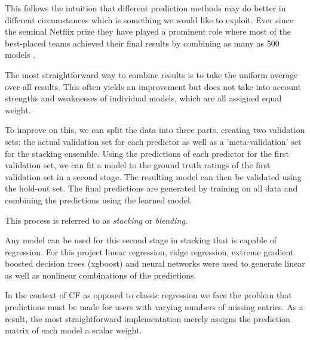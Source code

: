 \documentclass[10pt,conference,compsocconf]{IEEEtran}
\begin{document}
This follows the intuition that different prediction methods may do better in different circumstances which is something we would like to exploit. Ever since the seminal Netflix prize they have played a prominent role where most of the best-placed teams achieved their final results by combining as many as 500 models \cite{Koren2009,toscher2009bigchaos}. %

The most straightforward way to combine results is to take the uniform average over all results. This often yields an improvement but does not take into account strengths and weaknesses of individual models, which are all assigned equal weight.

To improve on this, we can split the data into three parts, creating two validation sets: the actual validation set for each predictor as well as a 'meta-validation' set for the stacking ensemble.
Using the predictions of each predictor for the first validation set, we can fit a model to the ground truth ratings of the first validation set in a second stage. The resulting model can then be validated using the hold-out set. The final predictions are generated by training on all data and combining the predictions using the learned model.

This process is referred to as \textit{stacking} or \textit{blending}.

Any model can be used for this second stage in stacking that is capable of regression. For this project linear regression, ridge regression, extreme gradient boosted decision trees (xgboost) and neural networks were used to generate linear as well as nonlinear combinations of the predictions.

In the context of CF as opposed to classic regression we face the problem that predictions must be made for users with varying numbers of missing entries. As a result, the most straightforward implementation merely assigns the prediction matrix of each model a scalar weight.
\end{document}
